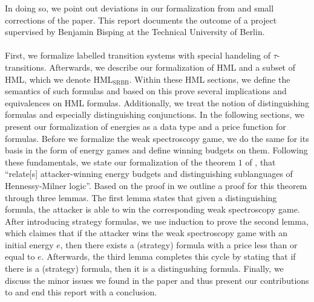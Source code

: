 In doing so, we point out deviations in our formalization from and small corrections of the paper. This report documents the outcome of a project supervised by Benjamin Bisping at the Technical University of Berlin. 
\\\\
First, we formalize labelled transition systems with special handeling of $\tau$-transitions.
Afterwards, we describe our formalization of HML and a subset of HML, which we denote HML$_\text{SRBB}$.
Within these HML sections, we define the semantics of such formulas and based on this prove several implications and equivalences on HML formulas.
Additionally, we treat the notion of distinguishing formulas and especially distinguishing conjunctions.
In the following sections, we present our formalization of energies as a data type and a price function for formulas.
Before we formalize the weak spectroscopy game, we do the same for its basis in the form of energy games and define winning budgets on them.
Following these fundamentals, we state our formalization of the theorem $1$ of \cite{bisping2023lineartimebranchingtime}, that ``relate[s] attacker-winning energy budgets and distinguishing sublanguages of Hennessy-Milner logic''\cite[Abstract]{bisping2023lineartimebranchingtime}. 
Based on the proof in \cite{bisping2023lineartimebranchingtime} we outline a proof for this theorem through three lemmas. 
The first lemma states that given a distinguishing formula, the attacker is able to win the corresponding weak spectroscopy game.
After introducing strategy formulas, we use induction to prove the second lemma, which claimes that if the attacker wins the weak spectroscopy game with an initial energy $e$, then there exists a (strategy) formula with a price less than or equal to $e$.
Afterwards, the third lemma completes this cycle by stating that if there is a (strategy) formula, then it is a distingushing formula.
Finally, we discuss the minor issues we found in the paper and thus present our contributions to \cite{bisping2023lineartimebranchingtime} and end this report with a conclusion.